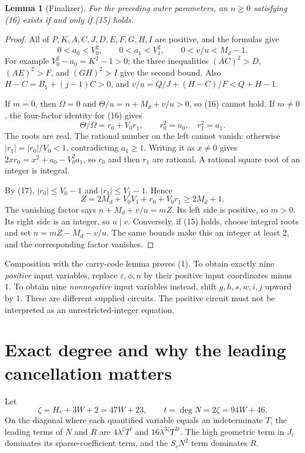\documentclass[11pt]{article}
\newtheorem{lemma}[theorem]{Lemma}
\theoremstyle{definition}\newtheorem{definition}[theorem]{Definition}
\begin{document}
\begin{lemma}[Finalizer]
For the preceding outer parameters, an $n\geq0$ satisfying (16) exists
if and only if (15) holds.
\end{lemma}
\begin{proof}
All of $P,K,A,C,J,D,E,F,G,H,I$ are positive, and the formulas give
\[
0<a_0<V_0^2,\qquad0<a_1<V_1^2,\qquad
0<v/u<M_d-1.                                      \tag{17}
\]
For example $V_0^2-a_0=K^2-1>0$; the three inequalities
$(AC)^2>D$, $(AE)^2>F$, and $(GH)^2>I$ give the second bound.
Also $H-C=B_1+(j-1)C>0$, and
$v/u=Q/J+(H-C)/F<Q+H-1$.

If $m=0$, then $\Omega=0$ and
$\Theta/u=n+M_d+v/u>0$, so (16) cannot hold. If $m\ne0$,
the four-factor identity for (16) gives
\[
 \Theta/\Omega=r_0+V_0r_1,\qquad r_0^2=a_0,\quad r_1^2=a_1.
\]
The roots are real. The rational number on the left cannot vanish:
otherwise $|r_1|=|r_0|/V_0<1$, contradicting $a_1\geq1$.
Writing it as $x\ne0$ gives
$2xr_0=x^2+a_0-V_0^2a_1$, so $r_0$ and then $r_1$ are rational.
A rational square root of an integer is integral.

By (17), $|r_0|\leq V_0-1$ and $|r_1|\leq V_1-1$. Hence
\[
 Z=2M_d+V_0V_1+r_0+V_0r_1\geq2M_d+1.
\]
The vanishing factor says
$n+M_d+v/u=mZ$. Its left side is positive, so $m>0$.
Its right side is an integer, so $u\mid v$.
Conversely, if (15) holds, choose integral roots and set
$n=mZ-M_d-v/u$. The same bounds make this an integer at least 2,
and the corresponding factor vanishes.
\end{proof}

Composition with the carry-code lemma proves (1). To obtain exactly nine
\emph{positive} input variables, replace $\varepsilon,\phi,n$ by their
positive input coordinates minus 1. To obtain nine \emph{nonnegative}
input variables instead, shift $g,h,s,w,i,j$ upward by 1.
These are different supplied circuits. The positive circuit must not be
interpreted as an unrestricted-integer equation.

\section{Exact degree and why the leading cancellation matters}
\label{sec:degree}

Let
\[
 \zeta=H_*+3W+2=47W+23,\qquad t=\deg N=2\zeta=94W+46.
\]
On the diagonal where each quantified variable equals an indeterminate
$T$, the leading terms of $N$ and $R$ are
$4\lambda^{\zeta}T^t$ and
$16\lambda^{3\zeta}T^{3t}$.
The high geometric term in $J_c$ dominates its sparse-coefficient term,
and the $S_cN^2$ term dominates $R$.
\end{document}
